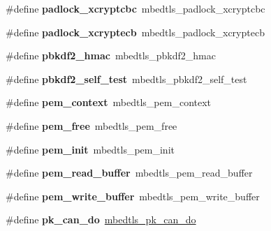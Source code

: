 \begin{DoxyCompactItemize}
\mbox{\label{compat-1_83_8h_a3788ea0f0500a0be43ac30664af3f1b4}} 
\#define {\bfseries padlock\+\_\+xcryptcbc}~mbedtls\+\_\+padlock\+\_\+xcryptcbc
\item 
\mbox{\label{compat-1_83_8h_ab0827df39db67247591a27094cfc64ea}} 
\#define {\bfseries padlock\+\_\+xcryptecb}~mbedtls\+\_\+padlock\+\_\+xcryptecb
\item 
\mbox{\label{compat-1_83_8h_aed93945b4ca8c6aece5652fbfe494f18}} 
\#define {\bfseries pbkdf2\+\_\+hmac}~mbedtls\+\_\+pbkdf2\+\_\+hmac
\item 
\mbox{\label{compat-1_83_8h_a345b31ed49c064524f6214d1c325b702}} 
\#define {\bfseries pbkdf2\+\_\+self\+\_\+test}~mbedtls\+\_\+pbkdf2\+\_\+self\+\_\+test
\item 
\mbox{\label{compat-1_83_8h_a4bc4cd04c1945439a87f3a42e8c98d79}} 
\#define {\bfseries pem\+\_\+context}~mbedtls\+\_\+pem\+\_\+context
\item 
\mbox{\label{compat-1_83_8h_a6bf177cadc5c403b038a554b0b964333}} 
\#define {\bfseries pem\+\_\+free}~mbedtls\+\_\+pem\+\_\+free
\item 
\mbox{\label{compat-1_83_8h_a1d466b90a49b13285db8d5bf5c70005d}} 
\#define {\bfseries pem\+\_\+init}~mbedtls\+\_\+pem\+\_\+init
\item 
\mbox{\label{compat-1_83_8h_a7840782f867eba1791635ee3b8b13325}} 
\#define {\bfseries pem\+\_\+read\+\_\+buffer}~mbedtls\+\_\+pem\+\_\+read\+\_\+buffer
\item 
\mbox{\label{compat-1_83_8h_a4e8691b72194067a6d7532cb99d9d9c6}} 
\#define {\bfseries pem\+\_\+write\+\_\+buffer}~mbedtls\+\_\+pem\+\_\+write\+\_\+buffer
\item 
\mbox{\label{compat-1_83_8h_adb81deb436433f49f35ae15fa09e2f3a}} 
\#define {\bfseries pk\+\_\+can\+\_\+do}~\mbox{\hyperlink{pk_8h_a2d72c66f5e78abe153bdf08874aaabf6}{mbedtls\+\_\+pk\+\_\+can\+\_\+do}}
\item 
\mbox{\label{compat-1_83_8h_a789e6342771c2a7b3c3c148322e83e07}} 

\end{DoxyCompactItemize}
